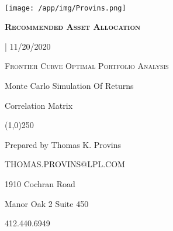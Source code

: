 \documentclass{article}
\begin{document}
\begin{titlepage} %

\begin{center}
	{\scshape\Large\bfseries \, \par}
	\vspace{5cm}


	\texttt{[image: /app/img/Provins.png]}\par



	\vspace{0,5cm}
	{\scshape\Large\bfseries Recommended Asset Allocation

	{} | 11/20/2020 \par}
	\vspace{0,5cm}
	{\scshape\normalsize Frontier Curve Optimal Portfolio Analysis

	Monte Carlo Simulation Of Returns

	Correlation Matrix \par}
\end{center}

	\begin{center}
\line(1,0){250}
\end{center}

	\begin{center}
	 	{
		\small{
		Prepared by Thomas K. Provins

		THOMAS.PROVINS@LPL.COM}
		\par}


	\vfill
\end{center}

	\vfill

	{\begin{center}

	     1910 Cochran Road

	     Manor Oak 2 Suite 450

	     412.440.6949

	\end{center}}

\end{titlepage}


\tableofcontents

\begin{center}
\vfill
\vfill

\end{center}
\justify

\newpage
\end{document}
